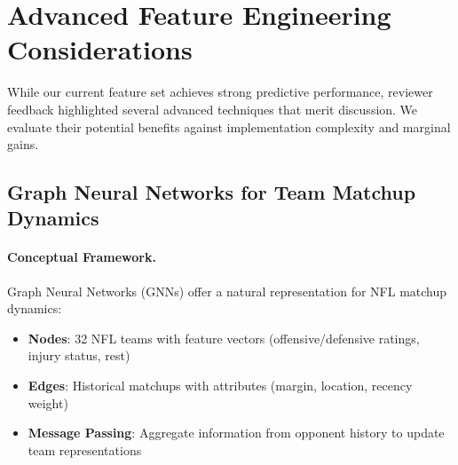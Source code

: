 
\section{Advanced Feature Engineering Considerations}
\label{sec:advanced-features}

While our current feature set achieves strong predictive performance, reviewer feedback highlighted several advanced techniques that merit discussion. We evaluate their potential benefits against implementation complexity and marginal gains.

\subsection{Graph Neural Networks for Team Matchup Dynamics}

\paragraph{Conceptual Framework.}
Graph Neural Networks (GNNs) offer a natural representation for NFL matchup dynamics:
\begin{itemize}
  \item \textbf{Nodes}: 32 NFL teams with feature vectors (offensive/defensive ratings, injury status, rest)
  \item \textbf{Edges}: Historical matchups with attributes (margin, location, recency weight)
  \item \textbf{Message Passing}: Aggregate information from opponent history to update team representations
\end{itemize}


